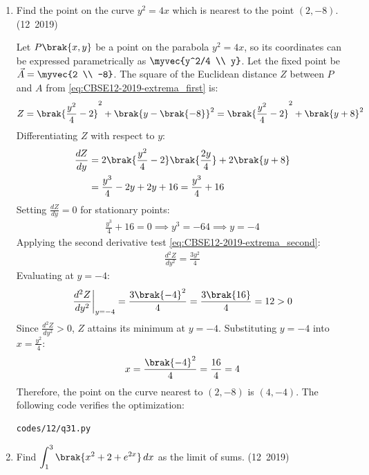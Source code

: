 \begin{enumerate}[label=\thesubsection.\arabic*, ref=\thesubsection.\theenumi]
\item Find the point on the curve $y^2 = 4x$ which is nearest to the point $(2, -8)$.
\hfill (12~2019)

\solution
Let $P\brak{x, y}$ be a point on the parabola $y^2 = 4x$, so its coordinates can be expressed parametrically as $\myvec{y^2/4 \\ y}$.
Let the fixed point be $\vec{A} = \myvec{2 \\ -8}$.
The square of the Euclidean distance $Z$ between $P$ and $A$ from \eqref{eq:CBSE12-2019-extrema_first} is:
\begin{align}
	Z = \brak{\frac{y^2}{4} - 2}^2 + \brak{y - \brak{-8}}^2 = \brak{\frac{y^2}{4} - 2}^2 + \brak{y + 8}^2
\end{align}
Differentiating $Z$ with respect to $y$:
\begin{align}
	\frac{dZ}{dy} &= 2\brak{\frac{y^2}{4} - 2}\brak{\frac{2y}{4}} + 2\brak{y + 8} \\
	&= \frac{y^3}{4} - 2y + 2y + 16 = \frac{y^3}{4} + 16
\end{align}
Setting $\frac{dZ}{dy} = 0$ for stationary points:
\begin{align}
	\frac{y^3}{4} + 16 = 0 \implies y^3 = -64 \implies y = -4
\end{align}
Applying the second derivative test \eqref{eq:CBSE12-2019-extrema_second}:
\begin{align}
	\frac{d^2Z}{dy^2} = \frac{3y^2}{4}
\end{align}
Evaluating at $y = -4$:
\begin{align}
	\left.\frac{d^2Z}{dy^2}\right|_{y=-4} = \frac{3\brak{-4}^2}{4} = \frac{3\brak{16}}{4} = 12 > 0
\end{align}
Since $\frac{d^2Z}{dy^2} > 0$, $Z$ attains its minimum at $y = -4$.
Substituting $y = -4$ into $x = \frac{y^2}{4}$:
\begin{align}
	x = \frac{\brak{-4}^2}{4} = \frac{16}{4} = 4
\end{align}
Therefore, the point on the curve nearest to $(2, -8)$ is $(4, -4)$.
The following code verifies the optimization:
\begin{lstlisting}[frame=single, basicstyle=\ttfamily\small]
	codes/12/q31.py
\end{lstlisting}

\item Find $\displaystyle\int_1^3 \brak{x^2 + 2 + e^{2x}}\,dx$ as the limit of sums.
\hfill (12~2019)


\end{enumerate}
